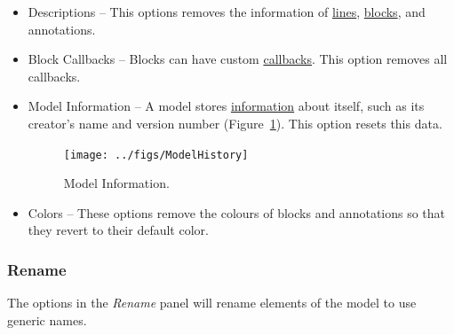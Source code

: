 \documentclass{article}
\begin{document}
\begin{itemize}
	\item Descriptions -- This options removes the  information of \href{https://www.mathworks.com/help/simulink/ug/signal-basics.html#bs9gzwp}{lines}, \href{https://www.mathworks.com/help/simulink/ug/block-properties-dialog-box.html}{blocks}, and annotations. 
	
	\item Block Callbacks -- Blocks can have custom \href{https://www.mathworks.com/help/simulink/ug/block-callbacks.html}{callbacks}. This option removes all callbacks.
	
	\item Model Information -- A \Simulink model stores \href{https://www.mathworks.com/help/simulink/ug/managing-model-versions.html}{information} about itself, such as its creator's name and version number (Figure~\ref{fig:model_history}). This option resets this data.
	
\begin{figure}[htb]
	\centering
	\texttt{[image: ../figs/ModelHistory]}
	\caption{Model Information.}
	\label{fig:model_history}
\end{figure}
	
	\item Colors -- These options remove the colours of blocks and annotations so that they revert to their default color.
\end{itemize}

\subsubsection{Rename}
\label{lbl:rename}
The options in the \emph{Rename} panel will rename elements of the model to use generic names.
\end{document}
